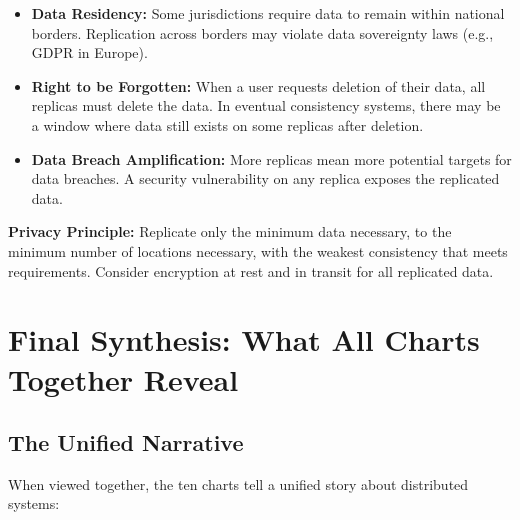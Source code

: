 \documentclass[10pt,a4paper]{article}
\begin{document}
\begin{itemize}
    \item \textbf{Data Residency:} Some jurisdictions require data to remain within national borders. Replication across borders may violate data sovereignty laws (e.g., GDPR in Europe).
    
    \item \textbf{Right to be Forgotten:} When a user requests deletion of their data, all replicas must delete the data. In eventual consistency systems, there may be a window where data still exists on some replicas after deletion.
    
    \item \textbf{Data Breach Amplification:} More replicas mean more potential targets for data breaches. A security vulnerability on any replica exposes the replicated data.
\end{itemize}

\textbf{Privacy Principle:} Replicate only the minimum data necessary, to the minimum number of locations necessary, with the weakest consistency that meets requirements. Consider encryption at rest and in transit for all replicated data.

\newpage


\section{Final Synthesis: What All Charts Together Reveal}

\subsection{The Unified Narrative}

When viewed together, the ten charts tell a unified story about distributed systems:
\end{document}
